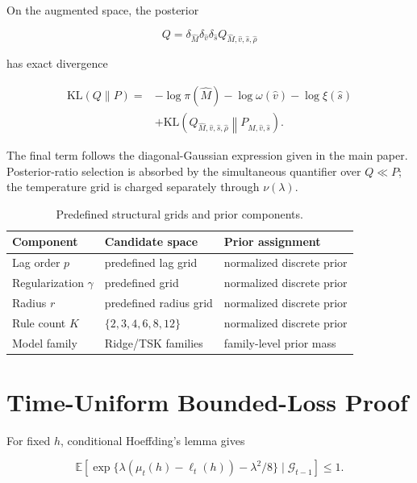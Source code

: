 \documentclass[12pt,draftclsnofoot,onecolumn]{IEEEtran}
\begin{document}
	On the augmented space, the posterior
	
	\begin{equation}
		Q=\delta_{\widehat M}\delta_{\widehat v}\delta_{\widehat s}
		Q_{\widehat M,\widehat v,\widehat s,\widehat\rho}
	\end{equation}
	
	has exact divergence
	
	\begin{align}
		\mathrm{KL}(Q\|P)
		={}&-\log\pi(\widehat M)
		-\log\omega(\widehat v)
		-\log\xi(\widehat s)
		\nonumber\\
		&+
		\mathrm{KL}
		\left(
		Q_{\widehat M,\widehat v,\widehat s,\widehat\rho}
		\middle\|
		P_{\widehat M,\widehat v,\widehat s}
		\right).
	\end{align}
	
	The final term follows the diagonal-Gaussian expression given in the main paper. Posterior-ratio selection is absorbed by the simultaneous quantifier over $Q\ll P$; the temperature grid is charged separately through $\nu(\lambda)$.
	
	\begin{table}[htbp]
		\centering
		\caption{Predefined structural grids and prior components.}
		\label{tab:prior_components}
		\small
		\begin{tabular}{lll}
			\toprule
			Component & Candidate space & Prior assignment\\
			\midrule
			Lag order $p$ & predefined lag grid & normalized discrete prior\\
			Regularization $\gamma$ & predefined grid & normalized discrete prior\\
			Radius $r$ & predefined radius grid & normalized discrete prior\\
			Rule count $K$ & $\{2,3,4,6,8,12\}$ & normalized discrete prior\\
			Model family & Ridge/TSK families & family-level prior mass\\
			\bottomrule
		\end{tabular}
	\end{table}
	
	\section{Time-Uniform Bounded-Loss Proof}
	\label{sup:proof}
	
	For fixed $h$, conditional Hoeffding's lemma gives
	
	\begin{equation}
		\mathbb E
		\left[
		\exp\{\lambda(\mu_t(h)-\ell_t(h))-\lambda^2/8\}
		\mid\mathcal G_{t-1}
		\right]
		\le1 .
	\end{equation}
	
\end{document}
